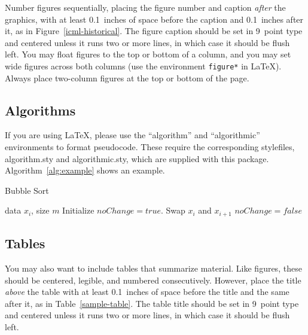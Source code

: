 \documentclass{article}
\begin{document}
Number figures sequentially, placing the figure number and caption
\emph{after} the graphics, with at least 0.1~inches of space before
the caption and 0.1~inches after it, as in
Figure~\ref{icml-historical}. The figure caption should be set in
9~point type and centered unless it runs two or more lines, in which
case it should be flush left. You may float figures to the top or
bottom of a column, and you may set wide figures across both columns
(use the environment \texttt{figure*} in \LaTeX). Always place
two-column figures at the top or bottom of the page.

\subsection{Algorithms}

If you are using \LaTeX, please use the ``algorithm'' and ``algorithmic''
environments to format pseudocode. These require
the corresponding stylefiles, algorithm.sty and
algorithmic.sty, which are supplied with this package.
Algorithm~\ref{alg:example} shows an example.

\begin{algorithm}[tb]
   \caption{Bubble Sort}
   \label{alg:example}
\begin{algorithmic}
    data $x_i$, size $m$
   \REPEAT
   \STATE Initialize $noChange = true$.
   \STATE Swap $x_i$ and $x_{i+1}$
   \STATE $noChange = false$
   \ENDIF
   \ENDFOR
\end{algorithmic}
\end{algorithm}

\subsection{Tables}

You may also want to include tables that summarize material. Like
figures, these should be centered, legible, and numbered consecutively.
However, place the title \emph{above} the table with at least
0.1~inches of space before the title and the same after it, as in
Table~\ref{sample-table}. The table title should be set in 9~point
type and centered unless it runs two or more lines, in which case it
should be flush left.

\end{document}
